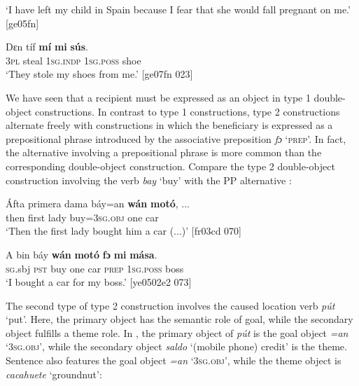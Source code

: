 \glt ‘I have left my child in Spain because I fear that she would fall pregnant on me.’ [ge05fn]
\z


\ea%
    \label{ex:key:1212}
    \gll Dɛn    tíf    \textbf{mí}    \textbf{mi}    \textbf{sús}.\\
\textsc{3pl}    steal  \textsc{1sg.indp}  \textsc{1sg.poss}  shoe\\

\glt ‘They stole my shoes from me.’ [ge07fn 023]
\z

We have seen that a recipient must be expressed as an object in type 1 double-object constructions. In contrast to type 1 constructions, type 2 constructions alternate freely with constructions in which the beneficiary is expressed as a prepositional phrase introduced by the associative preposition \textit{fɔ} ‘\textsc{prep}’. In fact, the alternative involving a prepositional phrase is more common than the corresponding double-object construction. Compare the type 2 double-object construction  involving the verb \textit{bay} ‘buy’ with the PP alternative :


\ea%
    \label{ex:key:1213}
    \gll \'{A}fta    primera  dama  báy=an    \textbf{wán}    \textbf{motó}, \op...\cp{}\\
then  first    lady    buy=\textsc{3sg.obj}  one    car\\

\glt ‘Then the first lady bought him a car (...)’ [fr03cd 070]
\z


\ea%
    \label{ex:key:1214}
    \gll \MakeUppercase{A}   bin  báy  \textbf{wán}    \textbf{motó}  \textbf{fɔ}  \textbf{mi}    \textbf{mása}.\\
\textsc{sg}.sbj  \textsc{pst}  buy  one    car    \textsc{prep}  \textsc{1sg.poss}  boss\\

\glt ‘I bought a car for my boss.’ [ye0502e2 073]
\z

The second type of type 2 construction involves the caused location verb \textit{pút} ‘put’. Here, the primary object has the semantic role of goal, while the secondary object fulfills a theme role. In , the primary object of \textit{pút} is the goal object \textit{=an} ‘\textsc{3sg.obj}’, while the secondary object \textit{saldo} ‘(mobile phone) credit’ is the theme. Sentence  also features the goal object \textit{=an} ‘\textsc{3sg.obj}’, while the theme object is \textit{cacahuete} ‘groundnut’:


